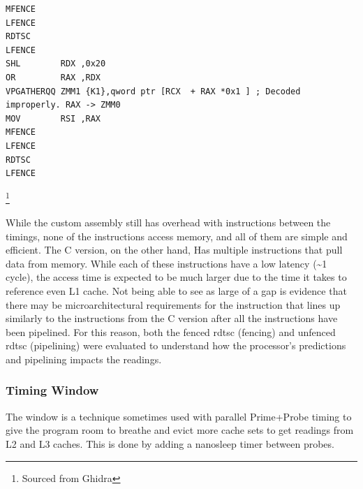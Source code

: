 \documentclass[article]{IEEEtran}
\begin{document}
\begin{lstlisting}[language={[x86masm]Assembler}, caption=Custom\, inline probe asm]
MFENCE
LFENCE
RDTSC
LFENCE
SHL        RDX ,0x20
OR         RAX ,RDX
VPGATHERQQ ZMM1 {K1},qword ptr [RCX  + RAX *0x1 ] ; Decoded improperly. RAX -> ZMM0
MOV        RSI ,RAX
MFENCE
LFENCE
RDTSC
LFENCE
\end{lstlisting}\footnote{Sourced from Ghidra}

While the custom assembly still has overhead with instructions between the timings, none of the instructions access memory, and all of them are simple and efficient. The C version, on the other hand, Has multiple instructions that pull data from memory. While each of these instructions have a low latency (\textasciitilde1 cycle), the access time is expected to be much larger due to the time it takes to reference even L1 cache. Not being able to see as large of a gap is evidence that there may be microarchitectural requirements for the instruction that lines up similarly to the instructions from the C version after all the instructions have been pipelined. For this reason, both the fenced rdtsc (fencing) and unfenced rdtsc (pipelining) were evaluated to understand how the processor's predictions and pipelining impacts the readings.

\subsubsection{Timing Window}
The window is a technique sometimes used with parallel Prime+Probe timing to give the program room to breathe and evict more cache sets to get readings from L2 and L3 caches. This is done by adding a nanosleep timer between probes. 
\end{document}
